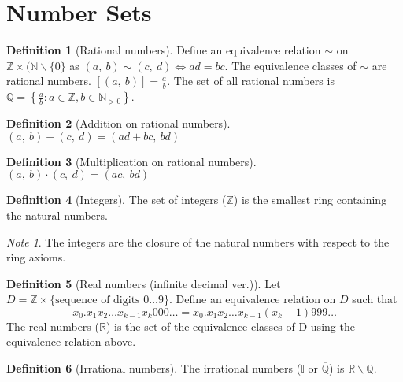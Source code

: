 \documentclass{article}
\theoremstyle{plain}
\numberwithin{theorem}{section}
\theoremstyle{definition}
\newtheorem{definition}{Definition}[section]
\numberwithin{definition}{section}
\theoremstyle{remark}
\newtheorem{note}{Note}[section]
\numberwithin{note}{section}
\newcommand*{\N}{\mathbb{N}}
\newcommand*{\Z}{\mathbb{Z}}
\newcommand*{\Q}{\mathbb{Q}}
\newcommand*{\I}{\mathbb{I}}
\newcommand*{\R}{\mathbb{R}}
\begin{document}
\section{Number Sets}
%
\begin{definition}[Rational numbers]
    Define an equivalence relation $\sim$ on $\Z \times (\N\backslash\{0\}$
    as $(a,\: b) \sim (c,\: d) \iff ad=bc$.
    The equivalence classes of $\sim$ are rational numbers.
    $[(a,\: b)] = \frac{a}{b}$.
    The set of all rational numbers is
    $\Q = \left\{ \frac{a}{b} : a\in \Z, b\in \N_{>0} \right\}$.
\end{definition}
%
\begin{definition}[Addition on rational numbers]
    $(a,\: b) + (c,\: d) = (ad+bc,\: bd)$
\end{definition}
%
\begin{definition}[Multiplication on rational numbers]
    $(a,\: b) \cdot (c,\: d) = (ac,\: bd)$
\end{definition}
%
%
\begin{definition}[Integers]
    The set of integers ($\Z$) is the smallest ring containing the natural numbers.
\end{definition}
\begin{note}
    The integers are the closure of the natural numbers with respect to the ring axioms.
\end{note}
%
\begin{definition}[Real numbers (infinite decimal ver.)]
    Let $D = \Z \times \{\text{sequence of digits $0\ldots 9$}\}$.
    Define an equivalence relation on $D$ such that
    \begin{equation*}
		x_0 . x_1 x_2 \dots x_{k-1} x_k 000 \ldots = x_0 . x_1 x_2 \dots x_{k-1} \left(x_k - 1\right)999 \ldots
	\end{equation*}
    The real numbers ($\R$) is the set of the equivalence classes of D using the equivalence relation above.
\end{definition}
%
\begin{definition}[Irrational numbers]
    The irrational numbers ($\I$ or $\overline{\Q}$) is $\R\backslash\Q$.
\end{definition}
%
\end{document}
